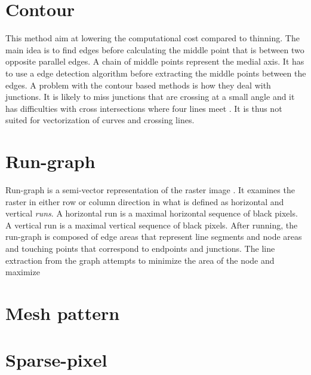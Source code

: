 \section{Contour}
This method aim at lowering the computational cost compared to thinning. The main idea is to find edges before calculating the middle point that is between two opposite parallel edges. A chain of middle points represent the medial axis. It has to use a edge detection algorithm before extracting the middle points between the edges. A problem with the contour based methods is how they deal with junctions. It is likely to miss junctions that are crossing at a small angle and it has difficulties with cross intersections where four lines meet \cite{Wenyin1999}. It is thus not suited for vectorization of curves and crossing lines.

\section{Run-graph}
Run-graph is a semi-vector representation of the raster image \cite{Monagan1993}. It examines the raster in either row or column direction in what is defined as horizontal and vertical \emph{runs}. A horizontal run is a maximal horizontal sequence of black pixels. A vertical run is a maximal vertical sequence of black pixels. After running, the run-graph is composed of edge areas that represent line segments and node areas and touching points that correspond to endpoints and junctions. The line extraction from the graph attempts to minimize the area of the node and maximize 

\section{Mesh pattern}

\section{Sparse-pixel}
